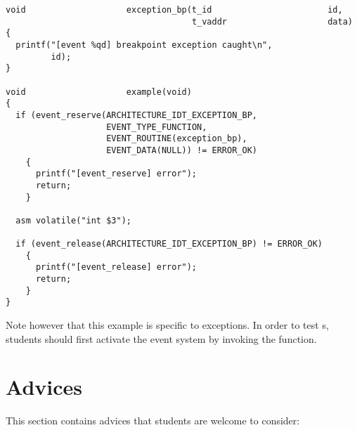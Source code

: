 \begin{verbatim}
void                    exception_bp(t_id                       id,
                                     t_vaddr                    data)
{
  printf("[event %qd] breakpoint exception caught\n",
         id);
}

void                    example(void)
{
  if (event_reserve(ARCHITECTURE_IDT_EXCEPTION_BP,
                    EVENT_TYPE_FUNCTION,
                    EVENT_ROUTINE(exception_bp),
                    EVENT_DATA(NULL)) != ERROR_OK)
    {
      printf("[event_reserve] error");
      return;
    }

  asm volatile("int $3");

  if (event_release(ARCHITECTURE_IDT_EXCEPTION_BP) != ERROR_OK)
    {
      printf("[event_release] error");
      return;
    }
}
\end{verbatim}

Note however that this example is specific to exceptions. In order to test
s, students should first activate the event system by invoking the
 function.

%
%

\section{Advices}

This section contains advices that students are welcome to consider:

